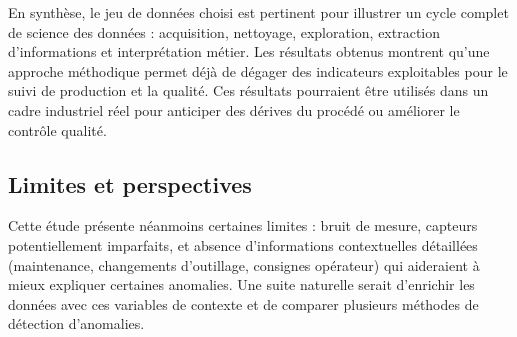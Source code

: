 \documentclass[11pt,a4paper]{article}
\begin{document}
En synthèse, le jeu de données choisi est pertinent pour illustrer un cycle complet de science des données : acquisition, nettoyage, exploration, extraction d'informations et interprétation métier. Les résultats obtenus montrent qu'une approche méthodique permet déjà de dégager des indicateurs exploitables pour le suivi de production et la qualité. Ces résultats pourraient être utilisés dans un cadre industriel réel pour anticiper des dérives du procédé ou améliorer le contrôle qualité.

\subsection*{Limites et perspectives}
Cette étude présente néanmoins certaines limites : bruit de mesure, capteurs potentiellement imparfaits, et absence d'informations contextuelles détaillées (maintenance, changements d'outillage, consignes opérateur) qui aideraient à mieux expliquer certaines anomalies. Une suite naturelle serait d'enrichir les données avec ces variables de contexte et de comparer plusieurs méthodes de détection d'anomalies.
\end{document}
